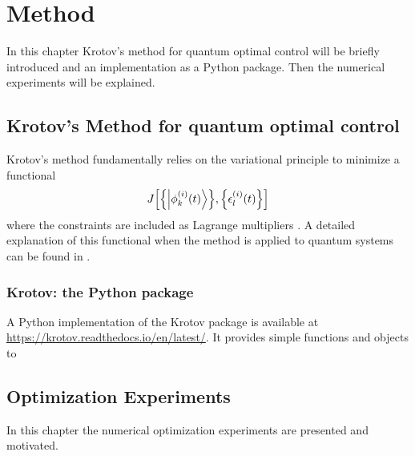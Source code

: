 \documentclass[main.tex]{subfiles}
\begin{document}
\chapter{Method}
In this chapter Krotov's method for quantum optimal control will be briefly introduced and an implementation as a Python package.
Then the numerical experiments will be explained.

\section{Krotov's Method for quantum optimal control}
Krotov's method fundamentally relies on the variational principle to minimize a functional \[ J\qty[\qty{\ket{\phi^{(i)}_k(t)}},\qty{\epsilon_l^{(i)}(t)}] \] where the constraints are included as Lagrange multipliers \cite{goerz_krotov:_2019}.
A detailed explanation of this functional when the method is applied to quantum systems can be found in \autocite{reich_monotonically_2012}. 

\subsection{Krotov: the Python package}
A Python implementation of the Krotov package is available at \url{https://krotov.readthedocs.io/en/latest/}. It provides simple functions and objects to


\section{Optimization Experiments}
In this chapter the numerical optimization experiments are presented and motivated.
\end{document}
